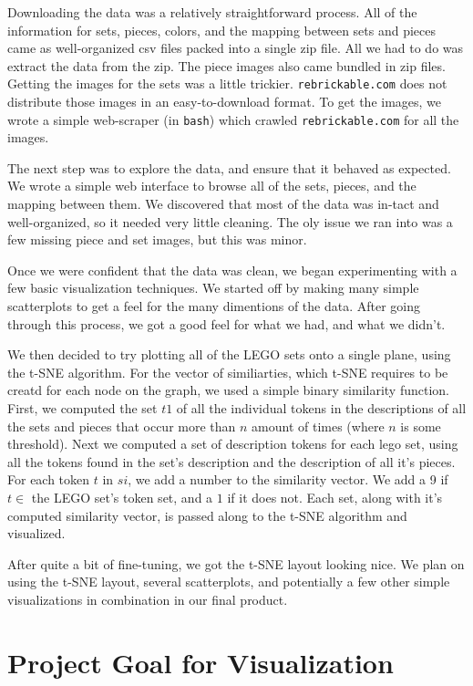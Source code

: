 \documentclass[a4paper, 11pt]{article}
\begin{document}
Downloading the data was a relatively straightforward process. All of the information for sets, pieces, colors, and the mapping between sets and pieces came as well-organized csv files packed into a single zip file. All we had to do was extract the data from the zip. The piece images also came bundled in zip files. Getting the images for the sets was a little trickier. \texttt{rebrickable.com} does not distribute those images in an easy-to-download format. To get the images, we wrote a simple web-scraper (in \texttt{bash}) which crawled \texttt{rebrickable.com} for all the images.

The next step was to explore the data, and ensure that it behaved as expected. We wrote a simple web interface to browse all of the sets, pieces, and the mapping between them. We discovered that most of the data was in-tact and well-organized, so it needed very little cleaning. The oly issue we ran into was a few missing piece and set images, but this was minor.

Once we were confident that the data was clean, we began experimenting with a few basic visualization techniques. We started off by making many simple scatterplots to get a feel for the many dimentions of the data. After going through this process, we got a good feel for what we had, and what we didn't.

We then decided to try plotting all of the LEGO sets onto a single plane, using the t-SNE algorithm. For the vector of similiarties, which t-SNE requires to be creatd for each node on the graph, we used a simple binary similarity function. First, we computed the set $t1$ of all the individual tokens in the descriptions of all the sets and pieces that occur more than $n$ amount of times (where $n$ is some threshold). Next we computed a set of description tokens for each lego set, using all the tokens found in the set's description and the description of all it's pieces. For each token $t$ in $si$, we add a number to the similarity vector. We add a 9 if $t \in$ the LEGO set's token set, and a $1$ if it does not. Each set, along with it's computed similarity vector, is passed along to the t-SNE algorithm and visualized.

After quite a bit of fine-tuning, we got the t-SNE layout looking nice. We plan on using the t-SNE layout, several scatterplots, and potentially a few other simple visualizations in combination in our final product.


\section*{Project Goal for Visualization}
\end{document}
